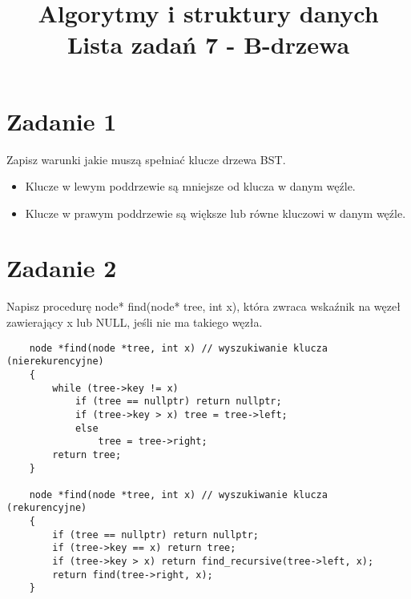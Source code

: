 \documentclass{article}
\title {
    \Huge\textbf{Algorytmy i struktury danych} \\
    \vspace{2mm}
    \huge{Lista zadań 7 - B-drzewa} 
    \date{}
}
\begin{document}
    \maketitle
    \boldmath
    \section*{Zadanie 1}
        Zapisz warunki jakie muszą spełniać klucze drzewa BST.
        \begin{itemize}
            \item Klucze w lewym poddrzewie są mniejsze od klucza w danym węźle.
            \item Klucze w prawym poddrzewie są większe lub równe kluczowi w danym węźle.
        \end{itemize}
    \section*{Zadanie 2}
    Napisz procedurę node* find(node* tree, int x), która zwraca wskaźnik na węzeł 
    zawierający x lub NULL, jeśli nie ma takiego węzła.
    \begin{lstlisting}
    node *find(node *tree, int x) // wyszukiwanie klucza (nierekurencyjne)
    {
        while (tree->key != x)
            if (tree == nullptr) return nullptr;
            if (tree->key > x) tree = tree->left;	 
            else				 
                tree = tree->right;	 
        return tree;
    }

    node *find(node *tree, int x) // wyszukiwanie klucza (rekurencyjne)
    {   
        if (tree == nullptr) return nullptr;
        if (tree->key == x) return tree;		   
        if (tree->key > x) return find_recursive(tree->left, x);										
        return find(tree->right, x); 
    }
    \end{lstlisting}
\end{document}
